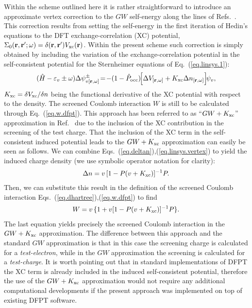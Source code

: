 \documentclass[twocolumn,prb,showpacs,superscriptaddress]{revtex4}
\def\w{\omega}
\def\H{\hat{H}}
\def\P{\hat{P}_{\rm occ}}
\def\E{\varepsilon}
\def\r{{\bf r}}
\def\rp{{\bf r^\prime}}
\begin{document}
Within the scheme outlined here it is rather straightforward to introduce
an approximate vertex correction to the $GW$ self-energy along the lines 
of Refs.\ . This correction results from setting
the self-energy in the first iteration of Hedin's equations to the DFT
exchange-correlation (XC) potential, $\Sigma_0(\r,\rp;\w) = \delta(\r,\rp) V_{\rm xc}(\r)$.
Within the present scheme such correction is simply obtained by including
the variation of the exchange-correlation
potential in the self-consistent potential for the Sternheimer equations of Eq.\ (\ref{eq.linsys.1}):
  \begin{equation}\label{eq.linsys.vertex}
  (\H-\E_v\pm\w) \Delta \psi^\pm_{v[\r,\w]}\!  = \!-(1-\P)\!  \Big[\Delta V_{[\r,\w]} + K_{\rm xc}\Delta n_{[\r,\w]}\Big] \! \psi_v,
  \end{equation}
$K_{\rm xc}=\delta V_{\rm xc}/\delta n$ being the functional derivative of the XC
potential with respect to the density. The screened Coulomb interaction $W$ is still
to be calculated through Eq.\ (\ref{eq.w.dfpt}). This approach has been referred to as
``$GW+K_{\rm xc}$'' approximation in Ref.\  due to the inclusion of the XC contribution
in the screening of the test charge. 
That the inclusion of the XC term in the self-consistent
induced potential leads to the $GW+K_{\rm xc}$ approximation can easily be seen as follows.
We can combine Eqs.\ (\ref{eq.deltan}),(\ref{eq.linsys.vertex}) to yield
the induced charge density (we use symbolic operator notation for clarity):
 \begin{equation}
 \Delta n = v\,[1- P (v+K_{\rm xc})]^{-1}P .
 \end{equation}
Then, we can substitute this result in the definition of the screened Coulomb interaction
Eqs.\ (\ref{eq.dhartree}),(\ref{eq.w.dfpt}) to find
 \begin{equation}
 W = v \,\{ 1 + v [1-P(v+K_{\rm xc})]^{-1}P \}.
 \end{equation}
The last equation yields precisely the screened Coulomb interaction in the $GW+K_{\rm xc}$ approximation.\cite{hl86,reining94}
The difference between this approach and the
standard $GW$ approximation is that in this case the screening
charge is calculated for a {\it test-electron}, while in the $GW$ approximation
the screening is calculated for a {\it test-charge}.
It is worth pointing out that in standard implementations of DFPT the
XC term is already included in the induced self-consistent potential,\cite{baroni.rmp}
therefore the use of the $GW+K_{\rm xc}$ approximation would not require any additional
computational developments if the 
present approach was implemented on top of existing DFPT software.\cite{espresso}
\end{document}
